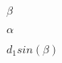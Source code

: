 \documentclass{article}
\begin{document}
$\beta$
\pagebreak

$\alpha$
\pagebreak

$d_1 sin(\beta)$
\pagebreak
\end{document}
